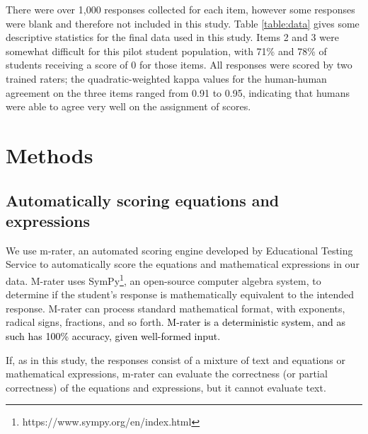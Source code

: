 \documentclass[11pt,a4paper]{article}
\newcommand{\AC}{\textcolor{black}} %
\begin{document}
There were over 1,000 responses collected for each item, however some responses were blank and therefore not included in this study. Table \ref{table:data} gives some descriptive statistics for the final data used in this study. Items 2 and 3 were somewhat difficult for this pilot student population, with 71\% and 78\% of students receiving a score of 0 for those items. All responses were scored by two trained raters; the quadratic-weighted kappa values for the human-human agreement on the three items ranged from 0.91 to 0.95, indicating that humans were able to agree very well on the assignment of scores. 



\section{Methods}
\label{section:methodology}

\subsection{Automatically scoring equations and expressions}
\label{subsection:mrater}

We use %
m-rater, an automated scoring engine developed by Educational Testing Service \cite{fife2013automated,fife2017m} to automatically score the equations and mathematical expressions in our data. M-rater uses SymPy\footnote{https://www.sympy.org/en/index.html}, an open-source computer algebra system, to determine if the student's response is mathematically equivalent to the intended response. M-rater %
can process standard mathematical format, with exponents, radical signs, fractions, and so forth. \AC{M-rater is a deterministic system, and as such has 100\% accuracy, given well-formed input.} %

If, as in this study, the responses consist of a mixture of text and equations or mathematical expressions, m-rater can evaluate the correctness (or partial correctness) of the equations and expressions, but it cannot evaluate text. 
\end{document}
